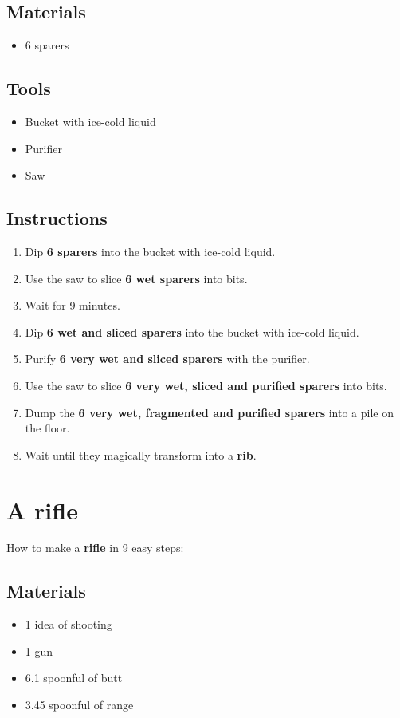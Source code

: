 \documentclass{article}
\begin{document}
\subsection{Materials}\begin{itemize}
\item 
6 sparers
\end{itemize}
\subsection{Tools}\begin{itemize}
\item 
Bucket with ice-cold liquid
\item 
Purifier
\item 
Saw
\end{itemize}
\subsection{Instructions}\begin{enumerate}
\item 
Dip \textbf{6 sparers} into the bucket with ice-cold liquid.
\item 
Use the saw to slice \textbf{6 wet sparers} into bits.
\item 
Wait for 9 minutes.
\item 
Dip \textbf{6 wet and sliced sparers} into the bucket with ice-cold liquid.
\item 
Purify \textbf{6 very wet and sliced sparers} with the purifier.
\item 
Use the saw to slice \textbf{6 very wet, sliced and purified sparers} into bits.
\item 
Dump the \textbf{6 very wet, fragmented and purified sparers} into a pile on the floor.
\item 
Wait until they magically transform into a \textbf{rib}.
\end{enumerate}
\newpage
\section{A rifle}How to make a \textbf{rifle} in 9 easy steps:

\subsection{Materials}\begin{itemize}
\item 
1 idea of shooting
\item 
1 gun
\item 
6.1 spoonful of butt
\item 
3.45 spoonful of range
\end{itemize}
\end{document}
